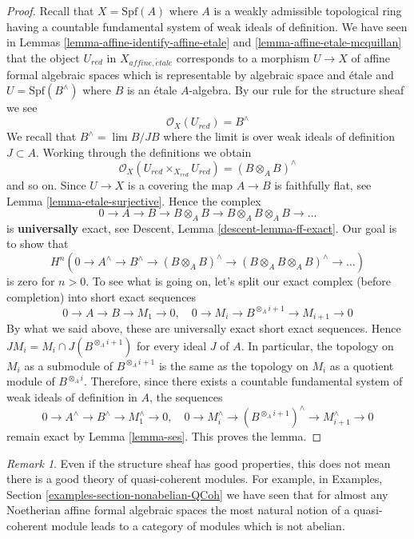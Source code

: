 \documentclass{stacks-project}
\theoremstyle{plain}
\theoremstyle{definition}
\theoremstyle{remark}
\newtheorem{remark}[subsection]{Remark}
\numberwithin{equation}{subsection}
\def\lim{\mathop{\mathrm{lim}}\nolimits}
\def\etale{{\acute{e}tale}}
\begin{document}
\begin{proof}
\medskip\noindent
Recall that $X = \text{Spf}(A)$ where $A$ is a
weakly admissible topological ring having a countable
fundamental system of weak ideals of definition.
We have seen in Lemmas
\ref{lemma-affine-identify-affine-etale} and
\ref{lemma-affine-etale-mcquillan}
that the object $U_{red}$ in $X_{affine, \etale}$
corresponds to a morphism $U \to X$ of affine formal
algebraic spaces which is representable by algebraic space and \'etale
and $U = \text{Spf}(B^\wedge)$ where $B$ is an \'etale $A$-algebra.
By our rule for the structure sheaf we see
$$
\mathcal{O}_X(U_{red}) = B^\wedge
$$
We recall that $B^\wedge = \lim B/JB$ where the limit is over weak
ideals of definition $J \subset A$.
Working through the definitions we obtain
$$
\mathcal{O}_X(U_{red} \times_{X_{red}} U_{red}) = (B \otimes_A B)^\wedge
$$
and so on. Since $U \to X$ is a covering the map $A \to B$
is faithfully flat, see Lemma \ref{lemma-etale-surjective}.
Hence the complex
$$
0 \to A \to B \to B \otimes_A B \to B \otimes_A B \otimes_A B \to \ldots
$$
is {\bf universally} exact, see Descent, Lemma \ref{descent-lemma-ff-exact}.
Our goal is to show that
$$
H^n(0 \to A^\wedge \to B^\wedge \to (B \otimes_A B)^\wedge
\to (B \otimes_A B \otimes_A B)^\wedge \to \ldots)
$$
is zero for $n > 0$. To see what is going on, let's split our
exact complex (before completion) into short exact sequences
$$
0 \to A \to B \to M_1 \to 0,\quad
0 \to M_i \to B^{\otimes_A i + 1} \to M_{i + 1} \to 0
$$
By what we said above, these are universally exact short exact
sequences. Hence $JM_i = M_i \cap J(B^{\otimes_A i + 1})$ for
every ideal $J$ of $A$. In particular, the
topology on $M_i$ as a submodule of $B^{\otimes_A i + 1}$
is the same as the topology on $M_i$ as a quotient module of
$B^{\otimes_A i}$. Therefore, since there exists a countable fundamental system
of weak ideals of definition in $A$, the sequences
$$
0 \to A^\wedge \to B^\wedge \to M_1^\wedge \to 0,\quad
0 \to M_i^\wedge \to (B^{\otimes_A i + 1})^\wedge \to M_{i + 1}^\wedge \to 0
$$
remain exact by Lemma \ref{lemma-ses}. This proves the lemma.
\end{proof}

\begin{remark}
\label{remark-bad-quasi-coherent}
Even if the structure sheaf has good properties, this does not
mean there is a good theory of quasi-coherent modules. For example,
in Examples, Section \ref{examples-section-nonabelian-QCoh}
we have seen that for almost any Noetherian affine formal algebraic spaces
the most natural notion of a quasi-coherent module leads to a
category of modules which is not abelian.
\end{remark}
\end{document}
